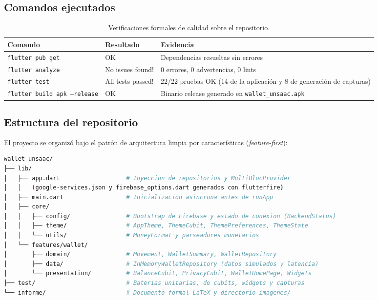 \documentclass[12pt,a4paper]{article}
\begin{document}
\subsection{Comandos ejecutados}
\begin{table}[h!]
\centering
\begin{tabular}{@{}lll@{}}
\toprule
\textbf{Comando} & \textbf{Resultado} & \textbf{Evidencia} \\
\midrule
\texttt{flutter pub get} & OK & Dependencias resueltas sin errores \\
\texttt{flutter analyze} & No issues found! & 0 errores, 0 advertencias, 0 lints \\
\texttt{flutter test} & All tests passed! & 22/22 pruebas OK (14 de la aplicación y 8 de generación de capturas) \\
\texttt{flutter build apk --release} & OK & Binario release generado en \texttt{wallet\_unsaac.apk} \\
\bottomrule
\end{tabular}
\caption{Verificaciones formales de calidad sobre el repositorio.}
\end{table}

\subsection{Estructura del repositorio}
El proyecto se organizó bajo el patrón de arquitectura limpia por características (\textit{feature-first}):

\begin{lstlisting}[language=bash,numbers=none]
wallet_unsaac/
├── lib/
│   ├── app.dart                   # Inyeccion de repositorios y MultiBlocProvider
│   │   (google-services.json y firebase_options.dart generados con flutterfire)
│   ├── main.dart                  # Inicializacion asincrona antes de runApp
│   ├── core/
│   │   ├── config/                # Bootstrap de Firebase y estado de conexion (BackendStatus)
│   │   ├── theme/                 # AppTheme, ThemeCubit, ThemePreferences, ThemeState
│   │   └── utils/                 # MoneyFormat y parseadores monetarios
│   └── features/wallet/
│       ├── domain/                # Movement, WalletSummary, WalletRepository
│       ├── data/                  # InMemoryWalletRepository (datos simulados y latencia)
│       └── presentation/          # BalanceCubit, PrivacyCubit, WalletHomePage, Widgets
├── test/                          # Baterias unitarias, de cubits, widgets y capturas
└── informe/                       # Documento formal LaTeX y directorio imagenes/
\end{lstlisting}
\end{document}
